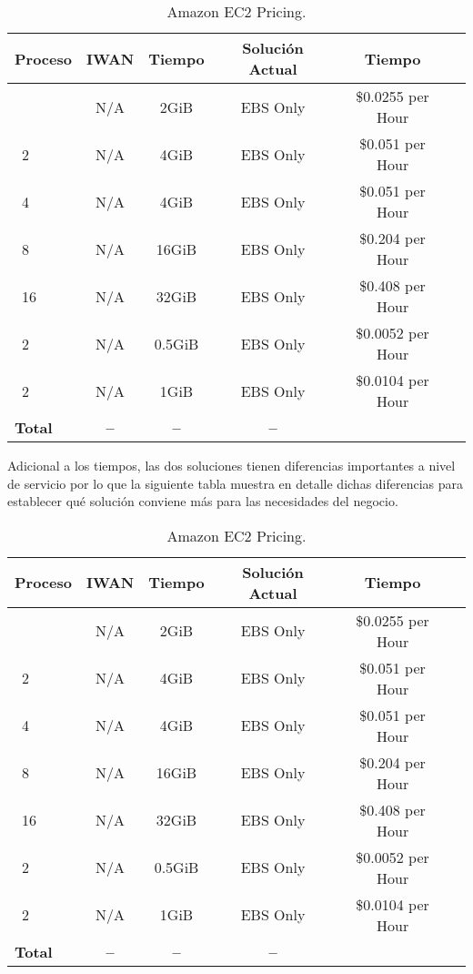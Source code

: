 \begin{table}[ht]
	\caption{Amazon EC2 Pricing.}
	\label{tab:hla:results}
\centering
\begin{tabular}{lccccc}
	\toprule
	\multicolumn{1}{c}{\textbf{Proceso}} 	& \textbf{IWAN}	& \textbf{Tiempo}	& \textbf{Solución Actual}
	& \textbf{Tiempo}\\
	\midrule
\cite{Aprovisionamiento tienda nueva} 		& N/A & 2GiB & EBS Only	& \$0.0255 per Hour \\
\cite{a1.large}~2 		& N/A & 4GiB & EBS Only & \$0.051 per Hour	\\
\cite{a1.xlarge}~4		& N/A & 4GiB & EBS Only & \$0.051 per Hour	\\
\cite{a1.2xlarge}~8 	& N/A & 16GiB & EBS Only & \$0.204 per Hour	\\
\cite{a1.4xlarge}~16	& N/A & 32GiB & EBS Only & \$0.408 per Hour	\\
\cite{t3.nano}~2		& N/A & 0.5GiB & EBS Only & \$0.0052 per Hour	\\
\cite{t3.micro}~2   	& N/A & 1GiB & EBS Only & \$0.0104 per Hour	\\
	\midrule
	\textbf{Total}			& \textbf{--}		& \textbf{--}		& \textbf{--} \\
	\bottomrule
\end{tabular}
\end{table}

Adicional a los tiempos, las dos soluciones tienen diferencias importantes a nivel de servicio por lo que la siguiente tabla muestra en detalle dichas diferencias para establecer qué solución conviene más para las necesidades del negocio.

\begin{table}[ht]
	\caption{Amazon EC2 Pricing.}
	\label{tab:hla:results}
\centering
\begin{tabular}{lccccc}
	\toprule
	\multicolumn{1}{c}{\textbf{Proceso}} 	& \textbf{IWAN}	& \textbf{Tiempo}	& \textbf{Solución Actual}
	& \textbf{Tiempo}\\
	\midrule
\cite{Aprovisionamiento tienda nueva} 		& N/A & 2GiB & EBS Only	& \$0.0255 per Hour \\
\cite{a1.large}~2 		& N/A & 4GiB & EBS Only & \$0.051 per Hour	\\
\cite{a1.xlarge}~4		& N/A & 4GiB & EBS Only & \$0.051 per Hour	\\
\cite{a1.2xlarge}~8 	& N/A & 16GiB & EBS Only & \$0.204 per Hour	\\
\cite{a1.4xlarge}~16	& N/A & 32GiB & EBS Only & \$0.408 per Hour	\\
\cite{t3.nano}~2		& N/A & 0.5GiB & EBS Only & \$0.0052 per Hour	\\
\cite{t3.micro}~2   	& N/A & 1GiB & EBS Only & \$0.0104 per Hour	\\
	\midrule
	\textbf{Total}			& \textbf{--}		& \textbf{--}		& \textbf{--} \\
	\bottomrule
\end{tabular}
\end{table}

